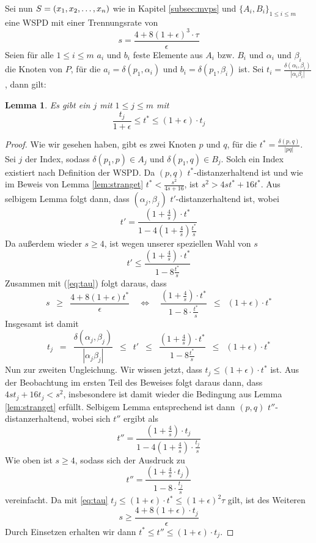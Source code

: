 \documentclass[11pt]{article}
\newtheorem{lemma}[theorem]{Lemma}
\begin{document}
	Sei nun $S = (x_1, x_2, \mathellipsis, x_n)$ wie in Kapitel \ref{subsec:mvps} und $\{A_i, B_i\}_{1 \leq i \leq m}$ eine WSPD mit einer Trennungsrate von 
	\[
	s = \frac{4 + 8(1 + \epsilon)^3 \cdot \tau}{\epsilon}
	\]
	Seien für alle $1 \leq i \leq m$ $a_i$ und $b_i$ feste Elemente aus $A_i$ bzw. $B_i$ und $\alpha_i$ und $\beta_i$ die Knoten von $P$, für die $a_i = \delta(p_1, \alpha_i)$ und $b_i = \delta(p_1, \beta_i)$ ist. 
	Sei $t_i = \frac{\delta(\alpha_i, \beta_i)}{|\alpha_i \beta_i|}$, dann gilt:
	\begin{lemma}
		\label{lem:tstartj}
		Es gibt ein $j$ mit $1 \leq j \leq m$ mit
		\[
			\frac{t_j}{1 + \epsilon} \leq t^* \leq (1 + \epsilon) \cdot t_j
		\]
	\end{lemma}
	\begin{proof}
		Wie wir gesehen haben, gibt es zwei Knoten $p$ und $q$, für die $t^* = \frac{\delta(p, q)}{|pq|}$. Sei $j$ der Index, sodass $\delta(p_1, p) \in A_j$ und $\delta(p_1, q) \in B_j$. Solch ein Index existiert nach Definition der WSPD. Da $(p, q)$ $t^*$-distanzerhaltend ist und wie im Beweis von Lemma \ref{lem:stranget} $t^* < \frac{s^2}{4s + 16}$, ist $s^2 > 4st^* + 16t^*$. 
		Aus selbigem Lemma folgt dann, dass $(\alpha_j, \beta_j)$ $t'$-distanzerhaltend ist, wobei
		\[
		t' = \frac{(1 + \frac{4}{s}) \cdot t^*}{1 - 4(1 + \frac{4}{s})\frac{t^*}{s}}
		\]
		Da außerdem wieder $s \geq 4$, ist wegen unserer speziellen Wahl von $s$
		\[
		t' \leq \frac{(1 + \frac{4}{s}) \cdot t^*}{1 - 8\frac{t^*}{s}}
		\]
		Zusammen mit (\ref{eq:tau}) folgt daraus, dass 
		\[
		s 
		\enspace\geq\enspace \frac{4 + 8(1 + \epsilon)t^*}{\epsilon} 
		\quad \Leftrightarrow \quad
		\frac{(1 + \frac{4}{s})\cdot t^*}{1 - 8 \cdot \frac{t^*}{s}} 
		\enspace\leq\enspace (1 + \epsilon)\cdot t^*
		\]
		Insgesamt ist damit
		\[
		t_j 
		\enspace = \enspace \frac{\delta(\alpha_j, \beta_j)}{|\alpha_j \beta_j|} 
		\enspace\leq\enspace t' 
		\enspace\leq\enspace \frac{(1 + \frac{4}{s}) \cdot t^*}{1 - 8\frac{t^*}{s}}
		\enspace\leq\enspace (1 + \epsilon)\cdot t^*
		\]
		Nun zur zweiten Ungleichung. 
		Wir wissen jetzt, dass $t_j \leq (1 + \epsilon) \cdot t^*$ ist.
		Aus der Beobachtung im ersten Teil des Beweises folgt daraus dann, dass $4st_j + 16t_j < s^2$, insbesondere ist damit wieder die Bedingung aus Lemma \ref{lem:stranget} erfüllt.
		Selbigem Lemma entsprechend ist dann $(p, q)$ $t''$-distanzerhaltend, wobei sich $t''$ ergibt als
		\[
		t'' = \frac{(1 + \frac{4}{s})\cdot t_j}{1 - 4 (1 + \frac{4}{s}) \cdot \frac{t_j}{s}}
		\]
		Wie oben ist $s \geq 4$, sodass sich der Ausdruck zu 
		\[
		t'' = \frac{(1 + \frac{4}{s}\cdot t_j)}{1 - 8 \cdot \frac{t_j}{s}}
		\]
		vereinfacht.
		Da mit \ref{eq:tau} $t_j \leq (1 + \epsilon) \cdot t^* \leq (1 + \epsilon)^2 \tau$ gilt, ist des Weiteren
		\[
		s \geq \frac{4 + 8 (1 + \epsilon) \cdot t_j}{\epsilon}
		\]
		Durch Einsetzen erhalten wir dann $t^* \leq t'' \leq (1 + \epsilon)\cdot t_j$.
	\end{proof}
	
\end{document}

